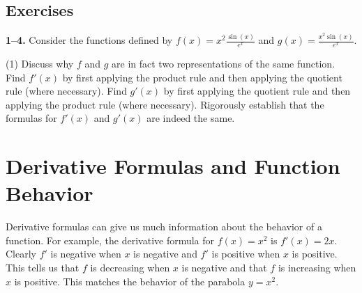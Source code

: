 \documentclass[10pt,oneside,]{book}
\theoremstyle{plain}
\theoremstyle{definition}
\numberwithin{equation}{section}
\newcommand{\fe}[2]{#1\mathopen{}\left(#2\right)\mathclose{}}
\newcommand{\fd}[1]{#1'}
\begin{document}
\subsection[Exercises]{Exercises}\label{exercises-40}
\textbf{1--4. }\hypertarget{exercisegroup-81}{\null}Consider the functions defined by \(\fe{f}{x}=x^2\frac{\fe{\sin}{x}}{e^x}\) and \(\fe{g}{x}=\frac{x^2\fe{\sin}{x}}{e^x}\).%
\par
\begin{exercisegroup}(1)
\exercise[1.]\hypertarget{exercise-392}{\null}Discuss why \(f\) and \(g\) are in fact two representations of the same function.%
\exercise[2.]\hypertarget{exercise-393}{\null}Find \(\fe{\fd{f}}{x}\) by first applying the product rule and then applying the quotient rule (where necessary).%
\exercise[3.]\hypertarget{exercise-394}{\null}Find \(\fe{\fd{g}}{x}\) by first applying the quotient rule and then applying the product rule (where necessary).%
\exercise[4.]\hypertarget{exercise-395}{\null}Rigorously establish that the formulas for \(\fe{\fd{f}}{x}\) and \(\fe{\fd{g}}{x}\) are indeed the same.%
\end{exercisegroup}
\par\smallskip\noindent
\typeout{************************************************}
\typeout{************************************************}
\section[Derivative Formulas and Function Behavior]{Derivative Formulas and Function Behavior}\label{section-derivative-formulas-and-function-behavior}
Derivative formulas can give us much information about the behavior of a function.  For example, the derivative formula for \(\fe{f}{x}=x^2\) is \(\fe{\fd{f}}{x}=2x\).  Clearly \(\fd{f}\) is negative when \(x\) is negative and \(\fd{f}\) is positive when \(x\) is positive.  This tells us that \(f\) is decreasing when \(x\) is negative and that \(f\) is increasing when \(x\) is positive.  This matches the behavior of the parabola \(y=x^2\).%
\typeout{************************************************}
\typeout{************************************************}
\end{document}
